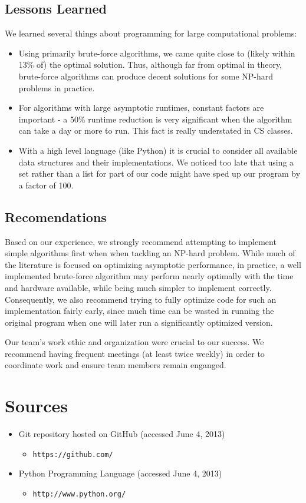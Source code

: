 \documentclass[11pt,english]{article}
\begin{document}
\subsection{Lessons Learned}
We learned several things about programming for large computational problems:
\begin{itemize}
\item Using primarily brute-force algorithms, we came quite close to (likely
within 13\% of) the optimal solution. Thus, although far from optimal in
theory, brute-force algorithms can produce decent solutions for some NP-hard
problems in practice.
\item For algorithms with large asymptotic runtimes, constant factors are
important - a 50\% runtime reduction is very significant when the algorithm can
take a day or more to run. This fact is really understated in CS classes.
\item With a high level language (like Python) it is crucial to consider all
available data structures and their implementations. We noticed too late that
using a set rather than a list for part of our code might have sped up our
program by a factor of 100.
\end{itemize}

\subsection{Recomendations}
Based on our experience, we strongly recommend attempting to implement simple
algorithms first when when tackling an NP-hard problem. While much of the
literature is focused on optimizing asymptotic performance, in practice, a well
implemented brute-force algorithm may perform nearly optimally with the time
and hardware available, while being much simpler to implement correctly.
Consequently, we also recommend trying to fully optimize code for such an
implementation fairly early, since much time can be wasted in running the
original program when one will later run a significantly optimized version.

Our team's work ethic and organization were crucial to our success. We
recommend having frequent meetings (at least twice weekly) in order to
coordinate work and ensure team members remain enganged.

\section{Sources}
\begin{itemize}
\item Git repository hosted on GitHub
(accessed June 4, 2013) 
\begin{itemize}
\item \texttt{https://github.com/}
\end{itemize}
\item Python Programming Language
(accessed June 4, 2013) 
\begin{itemize}
\item \texttt{http://www.python.org/}
\end{itemize}
\end{itemize}
\end{document}
